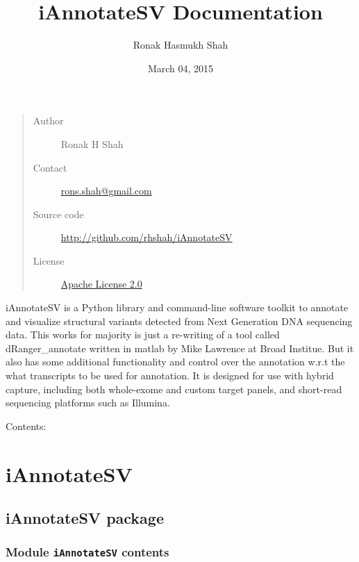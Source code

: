 \documentclass[letterpaper,10pt,english]{sphinxmanual}
\title{iAnnotateSV Documentation}
\date{March 04, 2015}
\author{Ronak Hasmukh Shah}
\begin{document}
\maketitle
\tableofcontents
{}\label{index::doc}

\begin{quote}\begin{description}
\item[{Author}] \leavevmode
Ronak H Shah

\item[{Contact}] \leavevmode
\href{mailto:rons.shah@gmail.com}{rons.shah@gmail.com}

\item[{Source code}] \leavevmode
\href{http://github.com/rhshah/iAnnotateSV}{http://github.com/rhshah/iAnnotateSV}

\item[{License}] \leavevmode
\href{http://www.apache.org/licenses/LICENSE-2.0}{Apache License 2.0}

\end{description}\end{quote}

iAnnotateSV is a Python library and command-line software toolkit to annotate and
visualize structural variants detected from Next Generation DNA sequencing data. This works for majority is just a re-writing of a tool called dRanger\_annotate written in matlab by Mike Lawrence at Broad Institue.
But it also has some additional functionality and control over the annotation w.r.t the what transcripts to be used for annotation.
It is designed for use with hybrid capture, including both whole-exome and custom target panels, and
short-read sequencing platforms such as Illumina.

Contents:


\chapter{iAnnotateSV}
\label{modules::doc}\label{modules:iannotatesv-annotation-of-structural-variants-detected-from-ngs}\label{modules:iannotatesv}

\section{iAnnotateSV package}
\label{iAnnotateSV:iannotatesv-package}\label{iAnnotateSV::doc}

\subsection{Module \texttt{iAnnotateSV} contents}
\label{iAnnotateSV:module-iannotatesv-contents}
\end{document}
